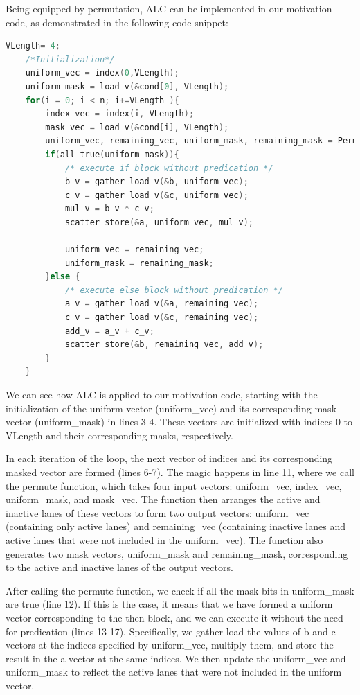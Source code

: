 \documentclass[\main/thesis.tex]{subfiles}
\begin{document}
Being equipped by permutation, ALC can be implemented in our motivation code, as demonstrated in the following code snippet:

\begin{lstlisting}[language=C]
    VLength= 4;
    /*Initialization*/
    uniform_vec = index(0,VLength);
    uniform_mask = load_v(&cond[0], VLength);
    for(i = 0; i < n; i+=VLength ){
        index_vec = index(i, VLength);
        mask_vec = load_v(&cond[i], VLength);
        uniform_vec, remaining_vec, uniform_mask, remaining_mask = Permute(uniform_vec, index_vec, uniform_mask, mask_vec);        
        if(all_true(uniform_mask)){
            /* execute if block without predication */
            b_v = gather_load_v(&b, uniform_vec);
            c_v = gather_load_v(&c, uniform_vec);
            mul_v = b_v * c_v;
            scatter_store(&a, uniform_vec, mul_v);

            uniform_vec = remaining_vec;
            uniform_mask = remaining_mask;
        }else {     
            /* execute else block without predication */
            a_v = gather_load_v(&a, remaining_vec);
            c_v = gather_load_v(&c, remaining_vec);
            add_v = a_v + c_v;
            scatter_store(&b, remaining_vec, add_v);
        } 
    }
\end{lstlisting}

We can see how ALC is applied to our motivation code, starting with the initialization of the uniform vector (uniform\_vec) and its corresponding mask vector (uniform\_mask) in lines 3-4. These vectors are initialized with indices 0 to VLength and their corresponding masks, respectively.

In each iteration of the loop, the next vector of indices and its corresponding masked vector are formed (lines 6-7). The magic happens in line 11, where we call the permute function, which takes four input vectors: uniform\_vec, index\_vec, uniform\_mask, and mask\_vec. The function then arranges the active and inactive lanes of these vectors to form two output vectors: uniform\_vec (containing only active lanes) and remaining\_vec (containing inactive lanes and active lanes that were not included in the uniform\_vec). The function also generates two mask vectors, uniform\_mask and remaining\_mask, corresponding to the active and inactive lanes of the output vectors.

After calling the permute function, we check if all the mask bits in uniform\_mask are true (line 12). If this is the case, it means that we have formed a uniform vector corresponding to the then block, and we can execute it without the need for predication (lines 13-17). Specifically, we gather load the values of b and c vectors at the indices specified by uniform\_vec, multiply them, and store the result in the a vector at the same indices. We then update the uniform\_vec and uniform\_mask to reflect the active lanes that were not included in the uniform vector.
\end{document}
